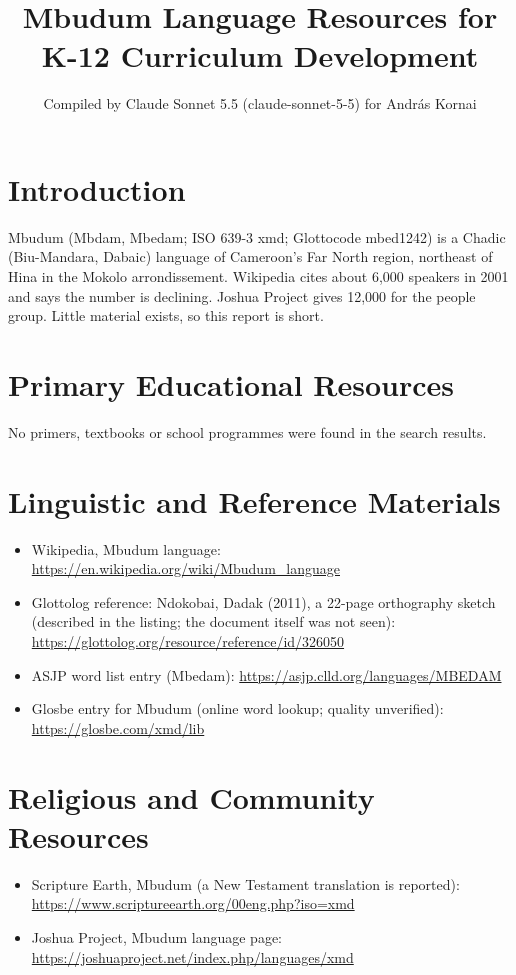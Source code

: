 \documentclass[12pt]{article}
\title{Mbudum Language Resources for K-12 Curriculum Development}
\author{Compiled by Claude Sonnet 5.5 (claude-sonnet-5-5) for Andr\'as Kornai}
\date{}
\begin{document}
\maketitle

\section{Introduction}
Mbudum (Mb\textschwa dam, Mbedam; ISO 639-3 xmd; Glottocode mbed1242) is a Chadic (Biu-Mandara, Dabaic) language of Cameroon's Far North region, northeast of Hina in the Mokolo arrondissement. Wikipedia cites about 6,000 speakers in 2001 and says the number is declining. Joshua Project gives 12,000 for the people group. Little material exists, so this report is short.

\section{Primary Educational Resources}
No primers, textbooks or school programmes were found in the search results.

\section{Linguistic and Reference Materials}
\begin{itemize}
\item Wikipedia, Mbudum language: \url{https://en.wikipedia.org/wiki/Mbudum_language}
\item Glottolog reference: Ndokobai, Dadak (2011), a 22-page orthography sketch (described in the listing; the document itself was not seen): \url{https://glottolog.org/resource/reference/id/326050}
\item ASJP word list entry (Mbedam): \url{https://asjp.clld.org/languages/MBEDAM}
\item Glosbe entry for Mbudum (online word lookup; quality unverified): \url{https://glosbe.com/xmd/lib}
\end{itemize}

\section{Religious and Community Resources}
\begin{itemize}
\item Scripture Earth, Mbudum (a New Testament translation is reported): \url{https://www.scriptureearth.org/00eng.php?iso=xmd}
\item Joshua Project, Mbudum language page: \url{https://joshuaproject.net/index.php/languages/xmd}
\end{itemize}
\end{document}
